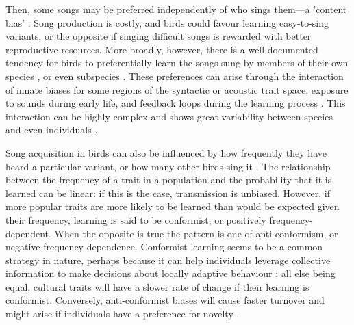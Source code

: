 Then, some songs may be preferred independently of who sings them---a 'content bias' \autocite{Richerson2005}. Song production is costly, and birds could favour learning easy-to-sing variants, or the opposite if singing difficult songs is rewarded with better reproductive resources. More broadly, however, there is a well-documented tendency for birds to preferentially learn the songs sung by members of their own species \autocite{slabbekoorn2002}, or even subspecies \autocite{nelson2000}. These preferences can arise through the interaction of innate biases for some regions of the syntactic or acoustic trait space, exposure to sounds during early life, and feedback loops during the learning process \autocite{feher2009,Feher2017,verzijden2012}. This interaction can be highly complex and shows great variability between species and even individuals \autocite{james2020,mets2017,mets2019,tencate2007}. 

Song acquisition in birds can also be influenced by how frequently they have heard a particular variant, or how many other birds sing it \autocite{aplin2015c,vanleeuwen2015}. The relationship between the frequency of a trait in a population and the probability that it is learned can be linear: if this is the case, transmission is unbiased. However, if more popular traits are more likely to be learned than would be expected given their frequency, learning is said to be conformist, or positively frequency-dependent. When the opposite is true the pattern is one of anti-conformism, or negative frequency dependence. Conformist learning seems to be a common strategy in nature, perhaps because it can help individuals leverage collective information to make decisions about locally adaptive behaviour \autocite{danchin2018,pike2010,whiten2019}; all else being equal, cultural traits will have a slower rate of change if their learning is conformist. Conversely, anti-conformist biases will cause faster turnover \autocite{acerbi2014} and might arise if individuals have a preference for novelty \autocite{Smaldino2015}.

